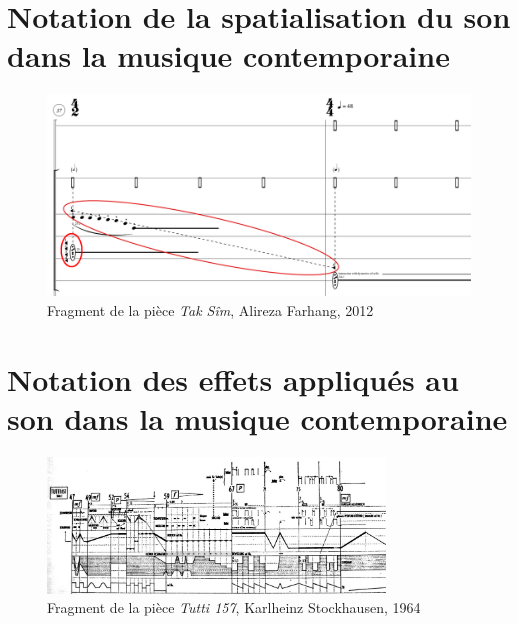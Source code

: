 \section{Notation de la spatialisation du son dans la musique contemporaine}
\label{sec:exempleAlirezaFarhang}
\begin{figure}[H]
	\centering
	\includegraphics[keepaspectratio=true, width=\textwidth]{Annexes/i/exempleAlirezaFarhang.png}
	\caption{Fragment de la pièce \textit{Tak Sîm}, Alireza Farhang, 2012}
	\medskip
	\small
	\label{fig:exempleAlirezaFarhang}
\end{figure}
\clearpage

\section{Notation des effets appliqués au son dans la musique contemporaine}
\label{sec:exempleStockhausen}
\begin{figure}[H]
	\centering
	\includegraphics[keepaspectratio=true, width=0.8\textwidth]{Annexes/i/exempleStockhausen.jpg}
	\caption{Fragment de la pièce \textit{Tutti 157}, Karlheinz Stockhausen, 1964}
	\medskip
	\small
	\label{fig:exempleStockhausen}
\end{figure}




